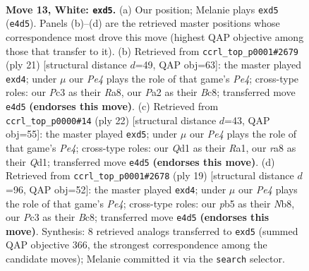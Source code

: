 \documentclass[11pt]{article}
\begin{document}
\clearpage

\begin{figure}[p]\centering
\begin{subfigure}{0.46\textwidth}\centering
\resizebox{\linewidth}{!}{%
\newchessgame
\chessboard[
  setfen={r1bq1rk1/2p2p2/2n2np1/ppbpp2p/B3P2P/2PP1N2/PP1N1PP1/R1BQR1K1 w - - 0 13},
  showmover=false,
  pgfstyle=straightmove, color=movearrow, markmove={e4-d5}
]}
\caption{}
\end{subfigure}\hfill
\begin{subfigure}{0.46\textwidth}\centering
\resizebox{\linewidth}{!}{%
\newchessgame
\chessboard[
  setfen={r1bqr1k1/1p1nbpp1/2pp1n1p/p3p3/P1BPP3/2N1BN1P/1PP2PP1/R2QR1K1 b - - 2 11},
  showmover=false,
  pgfstyle=straightmove, color=movearrow, markmove={e5-d4}
]}
\caption{}
\end{subfigure}
\\[4pt]
\begin{subfigure}{0.46\textwidth}\centering
\resizebox{\linewidth}{!}{%
\newchessgame
\chessboard[
  setfen={r1bqr1k1/b1p2pp1/p1n2n1p/1p1pp3/P3P3/1BPP1N2/1P1N1PPP/R1BQR1K1 w - - 0 12},
  showmover=false,
  pgfstyle=straightmove, color=movearrow, markmove={e4-d5}
]}
\caption{}
\end{subfigure}\hfill
\begin{subfigure}{0.46\textwidth}\centering
\resizebox{\linewidth}{!}{%
\newchessgame
\chessboard[
  setfen={rnbqrbk1/pp3pp1/2pp1n1p/4p3/P1BPP3/2N2N1P/1PP2PP1/R1BQR1K1 b - - 0 10},
  showmover=false,
  pgfstyle=straightmove, color=movearrow, markmove={e5-d4}
]}
\caption{}
\end{subfigure}
\caption{\textbf{Move 13, White: \texttt{exd5}.} (a) Our position; Melanie plays \texttt{exd5} (\texttt{e4d5}). Panels (b)--(d) are the retrieved master positions whose correspondence most drove this move (highest QAP objective among those that transfer to it). (b) Retrieved from \texttt{ccrl\_top\_p0001\#2679} (ply 21) [structural distance $d$=49, QAP obj=63]: the master played \texttt{exd4}; under $\mu$ our \emph{Pe4} plays the role of that game's \emph{Pe4}; cross-type roles: our \emph{P}c3 as their \emph{R}a8, our \emph{P}a2 as their \emph{B}c8; transferred move \texttt{e4d5} \textbf{(endorses this move)}. (c) Retrieved from \texttt{ccrl\_top\_p0000\#14} (ply 22) [structural distance $d$=43, QAP obj=55]: the master played \texttt{exd5}; under $\mu$ our \emph{Pe4} plays the role of that game's \emph{Pe4}; cross-type roles: our \emph{Q}d1 as their \emph{R}a1, our \emph{r}a8 as their \emph{Q}d1; transferred move \texttt{e4d5} \textbf{(endorses this move)}. (d) Retrieved from \texttt{ccrl\_top\_p0001\#2678} (ply 19) [structural distance $d$=96, QAP obj=52]: the master played \texttt{exd4}; under $\mu$ our \emph{Pe4} plays the role of that game's \emph{Pe4}; cross-type roles: our \emph{p}b5 as their \emph{N}b8, our \emph{P}c3 as their \emph{B}c8; transferred move \texttt{e4d5} \textbf{(endorses this move)}. Synthesis: 8 retrieved analogs transferred to \texttt{exd5} (summed QAP objective 366, the strongest correspondence among the candidate moves); Melanie committed it via the \texttt{search} selector.}
\label{fig:thought-m24}
\end{figure}
\end{document}
